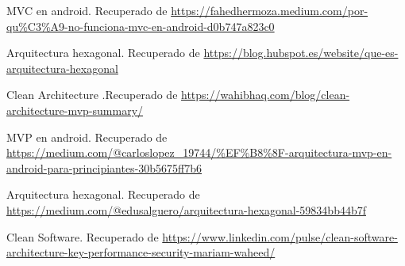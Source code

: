 \documentclass[a4paper]{article}
\begin{document}
    \begin{thebibliography}{9}
         MVC en android. Recuperado de \url{https://fahedhermoza.medium.com/por-qu%C3%A9-no-funciona-mvc-en-android-d0b747a823c0}
        
         Arquitectura hexagonal. Recuperado de \url{https://blog.hubspot.es/website/que-es-arquitectura-hexagonal}
    
         Clean Architecture .Recuperado de \url{https://wahibhaq.com/blog/clean-architecture-mvp-summary/}
        
         MVP en android. Recuperado de \url{https://medium.com/@carloslopez_19744/%EF%B8%8F-arquitectura-mvp-en-android-para-principiantes-30b5675ff7b6}

         Arquitectura hexagonal. Recuperado de \url{https://medium.com/@edusalguero/arquitectura-hexagonal-59834bb44b7f}

         Clean Software. Recuperado de \url{https://www.linkedin.com/pulse/clean-software-architecture-key-performance-security-mariam-waheed/}
        
        
    \end{thebibliography}
\end{document}
